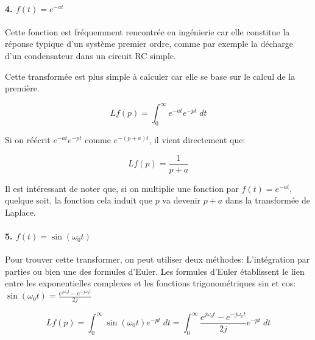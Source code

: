 \documentclass[11pt,a4paper]{article}
\begin{document}
\paragraph{\textbf{4.} $f(t) = e^{-at}$}
Cette fonction est fréquemment rencontrée en ingénierie car elle constitue la réponse typique d'un système premier ordre, comme par exemple la décharge d'un condensateur dans un circuit RC simple.
\begin{center}
\end{center}


Cette transformée est plus simple à calculer car elle se base sur le calcul de la première.

\[L{f}(p) = \int^{\infty}_{0} e^{-at} e^{-pt} \; dt\]

Si on réécrit $e^{-at} e^{-pt}$ comme $e^{-(p+a)t}$, il vient directement que: 

\[L{f}(p) = \frac{1}{p+a}\]

Il est intéressant de noter que, si on multiplie une fonction par $f(t) = e^{-at}$, quelque soit, la fonction cela induit que $p$ va devenir $p+a$ dans la transformée de Laplace.

\paragraph{\textbf{5.} $f(t) = \sin(\omega_0 t)$}
Pour trouver cette transformer, on peut utiliser deux méthodes: L'intégration par parties ou bien une des formules d'Euler. Les formules d'Euler établissent le lien entre les exponentielles complexes et les fonctions trigonométriques sin et cos:  $\sin(\omega_0 t) = \frac{e^{j \omega_0 t} - e^{-j \omega_0 t}}{2j}$

\[L{f}(p) = \int^{\infty}_{0} \sin(\omega_0 t) e^{-pt} \; dt =  \int^{\infty}_{0} \frac{e^{j \omega_0 t} - e^{-j \omega_0 t}}{2j} e^{-pt} \; dt\]
\end{document}
